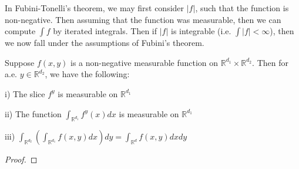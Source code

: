 \documentclass[class=article, crop=false]{standalone}
\begin{document}
			In Fubini-Tonelli's theorem, we may first consider $|f|$, such that the function is non-negative. Then assuming that the function was measurable, then we can compute $\int f$ by iterated integrals. Then if $|f|$ is integrable (i.e. $\int |f| < \infty$), then we now fall under the assumptions of Fubini's theorem.

			\begin{theorem} 
				Suppose $f(x,y)$ is a non-negative measurable function on $\mathbb{R}^{d_1} \times \mathbb{R}^{d_2}$. Then for a.e. $y \in \mathbb{R}^{d_2}$, we have the following:

					i) The slice $f^y$ is measurable on $\mathbb{R}^{d_1}$

					ii) The function $\int_{\mathbb{R}^{d_1}} f^y(x) dx$ is measurable on $\mathbb{R}^{d_1}$

					iii) $\int_{\mathbb{R}^{d_2}} (\int_{\mathbb{R}^{d_1}} f(x,y) dx) dy = \int_{\mathbb{R}^d} f(x,y) dx dy$
			\end{theorem}
			\begin{proof}

			\end{proof}
\end{document}
